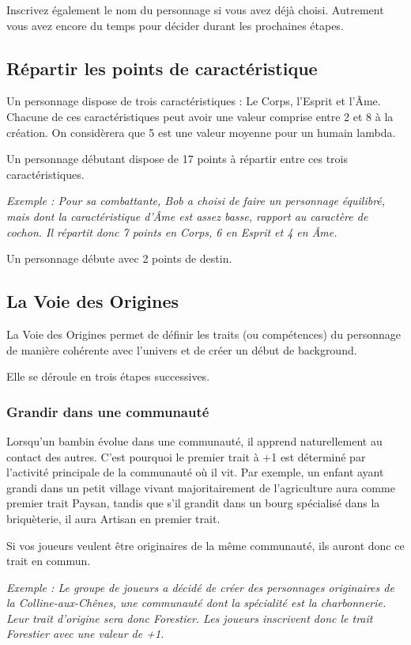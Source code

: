\documentclass[twoside,12pt,english]{book}
\begin{document}
Inscrivez également le nom du personnage si vous avez déjà choisi. Autrement vous avez encore du temps pour décider durant les prochaines étapes.

\subsection{Répartir les points de caractéristique}

Un personnage dispose de trois caractéristiques : Le Corps, l'Esprit et l'Âme. Chacune de ces caractéristiques peut avoir une valeur comprise entre 2 et 8 à la création. On considèrera que 5 est une valeur moyenne pour un humain lambda.

Un personnage débutant dispose de 17 points à répartir entre ces trois caractéristiques.

\emph{Exemple : Pour sa combattante, Bob a choisi de faire un personnage équilibré, mais dont la caractéristique d'Âme est assez basse, rapport au caractère de cochon. Il répartit donc 7 points en Corps, 6 en Esprit et 4 en Âme.}

Un personnage débute avec 2 points de destin.

\subsection{La Voie des Origines}

La Voie des Origines permet de définir les traits (ou compétences) du personnage de manière cohérente avec l'univers et de créer un début de background.

Elle se déroule en trois étapes successives.

\subsubsection*{Grandir dans une communauté}

Lorsqu'un bambin évolue dans une communauté, il apprend naturellement au contact des autres. C'est pourquoi le premier trait à +1 est déterminé par l'activité principale de la communauté où il vit. Par exemple, un enfant ayant grandi dans un petit village vivant majoritairement de l'agriculture aura comme premier trait Paysan, tandis que s'il grandit dans un bourg spécialisé dans la briquèterie, il aura Artisan en premier trait.

Si vos joueurs veulent être originaires de la même communauté, ils auront donc ce trait en commun.

\emph{Exemple : Le groupe de joueurs a décidé de créer des personnages originaires de la Colline-aux-Chênes, une communauté dont la spécialité est la charbonnerie. Leur trait d'origine sera donc Forestier. Les joueurs inscrivent donc le trait Forestier avec une valeur de +1.}
\end{document}
